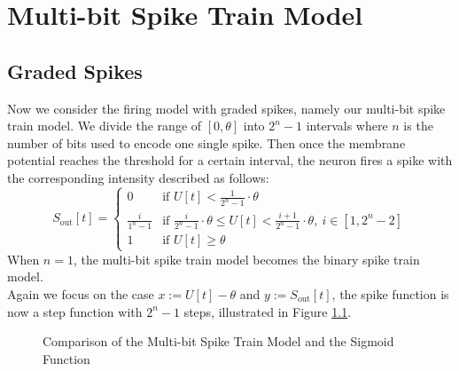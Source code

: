 \chapter{Multi-bit Spike Train Model}
\label{chap:multi-bit-spike-train-model}

\section{Graded Spikes}
\label{sec:graded-spikes}
    Now we consider the firing model with graded spikes, namely our multi-bit spike train model. We divide the range of $[0, \theta]$ into
    $2^n-1$ intervals where $n$ is the number of bits used to encode one single spike. Then once the membrane potential reaches the threshold 
    for a certain interval, the neuron fires a spike with the corresponding intensity described as follows:
    \begin{equation}
        S_{\text{out}}[t] = \begin{cases}
            0               & \text{if } U[t] < \frac{1}{2^n-1}\cdot\theta \\
            \frac{i}{1^n-1} & \text{if } \frac{i}{2^n-1}\cdot\theta \leq U[t] < \frac{i+1}{2^n-1}\cdot\theta,\ i\in [1, 2^n-2]\\
            1               & \text{if } U[t] \geq \theta
        \end{cases}
    \end{equation}
    When $n = 1$, the multi-bit spike train model becomes the binary spike train model. \\
    Again we focus on the case $x := U[t] - \theta$ and $y := S_{\text{out}}[t]$, the spike function is now a step function with $2^n-1$ steps, illustrated in Figure \ref{fig:multi-bit-spike_sigmoid}. 
    \begin{figure}[!htpb]
        \centering
        \caption{Comparison of the Multi-bit Spike Train Model and the Sigmoid Function}
        \label{fig:multi-bit-spike_sigmoid}
    \end{figure}

